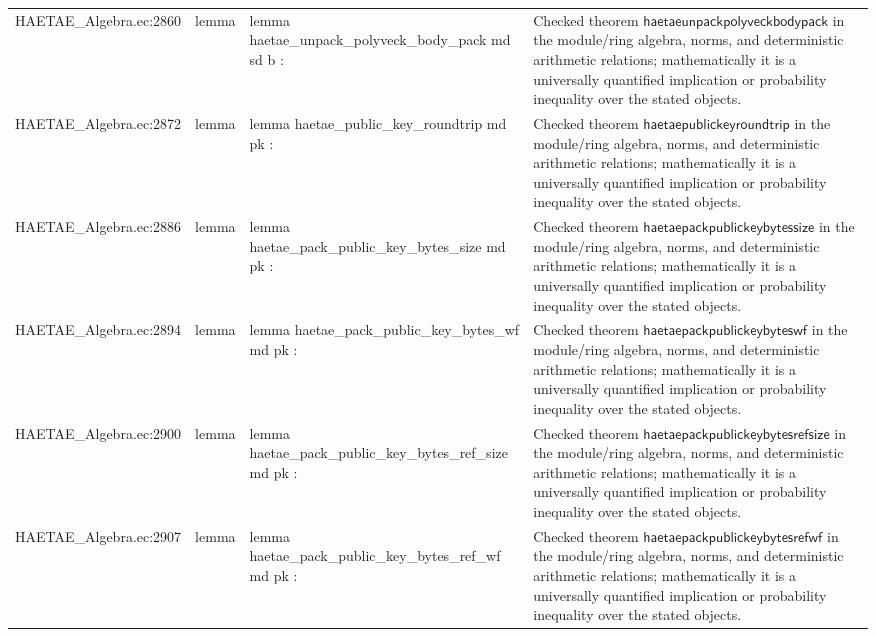 \documentclass[10pt]{article}
\begin{document}
\begin{longtable}{L{0.11\textwidth}L{0.055\textwidth}L{0.385\textwidth}L{0.41\textwidth}}
HAETAE\_\allowbreak{}Algebra.\allowbreak{}ec:\allowbreak{}2860 & lemma & {\ttfamily\scriptsize lemma haetae\_\allowbreak{}unpack\_\allowbreak{}polyveck\_\allowbreak{}body\_\allowbreak{}pack md sd b :} & Checked theorem $\mathsf{haetaeunpackpolyveckbodypack}$ in the module/ring algebra, norms, and deterministic arithmetic relations; mathematically it is a universally quantified implication or probability inequality over the stated objects. \\
HAETAE\_\allowbreak{}Algebra.\allowbreak{}ec:\allowbreak{}2872 & lemma & {\ttfamily\scriptsize lemma haetae\_\allowbreak{}public\_\allowbreak{}key\_\allowbreak{}roundtrip md pk :} & Checked theorem $\mathsf{haetaepublickeyroundtrip}$ in the module/ring algebra, norms, and deterministic arithmetic relations; mathematically it is a universally quantified implication or probability inequality over the stated objects. \\
HAETAE\_\allowbreak{}Algebra.\allowbreak{}ec:\allowbreak{}2886 & lemma & {\ttfamily\scriptsize lemma haetae\_\allowbreak{}pack\_\allowbreak{}public\_\allowbreak{}key\_\allowbreak{}bytes\_\allowbreak{}size md pk :} & Checked theorem $\mathsf{haetaepackpublickeybytessize}$ in the module/ring algebra, norms, and deterministic arithmetic relations; mathematically it is a universally quantified implication or probability inequality over the stated objects. \\
HAETAE\_\allowbreak{}Algebra.\allowbreak{}ec:\allowbreak{}2894 & lemma & {\ttfamily\scriptsize lemma haetae\_\allowbreak{}pack\_\allowbreak{}public\_\allowbreak{}key\_\allowbreak{}bytes\_\allowbreak{}wf md pk :} & Checked theorem $\mathsf{haetaepackpublickeybyteswf}$ in the module/ring algebra, norms, and deterministic arithmetic relations; mathematically it is a universally quantified implication or probability inequality over the stated objects. \\
HAETAE\_\allowbreak{}Algebra.\allowbreak{}ec:\allowbreak{}2900 & lemma & {\ttfamily\scriptsize lemma haetae\_\allowbreak{}pack\_\allowbreak{}public\_\allowbreak{}key\_\allowbreak{}bytes\_\allowbreak{}ref\_\allowbreak{}size md pk :} & Checked theorem $\mathsf{haetaepackpublickeybytesrefsize}$ in the module/ring algebra, norms, and deterministic arithmetic relations; mathematically it is a universally quantified implication or probability inequality over the stated objects. \\
HAETAE\_\allowbreak{}Algebra.\allowbreak{}ec:\allowbreak{}2907 & lemma & {\ttfamily\scriptsize lemma haetae\_\allowbreak{}pack\_\allowbreak{}public\_\allowbreak{}key\_\allowbreak{}bytes\_\allowbreak{}ref\_\allowbreak{}wf md pk :} & Checked theorem $\mathsf{haetaepackpublickeybytesrefwf}$ in the module/ring algebra, norms, and deterministic arithmetic relations; mathematically it is a universally quantified implication or probability inequality over the stated objects. \\

\end{longtable}
\end{document}
